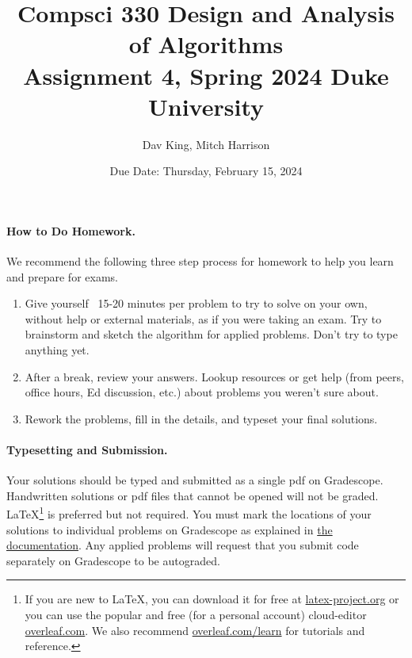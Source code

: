 \documentclass[11pt]{article}
\title{\vspace{-0.5in}Compsci 330 Design and Analysis of Algorithms \\Assignment 4, Spring 2024 Duke University}
\author{Dav King, Mitch Harrison}
\date{Due Date: Thursday, February 15, 2024}
\begin{document}
\maketitle



\paragraph{How to Do Homework.} We recommend the following three step process for homework to help you learn and prepare for exams.
\begin{enumerate}
	\item Give yourself ~15-20 minutes per problem to try to solve on your own, without help or external materials, as if you were taking an exam. Try to brainstorm and sketch the algorithm for applied problems. Don't try to type anything yet.
	\item After a break, review your answers. Lookup resources or get help (from peers, office hours, Ed discussion, etc.) about problems you weren't sure about.
	\item Rework the problems, fill in the details, and typeset your final solutions.
\end{enumerate}

\paragraph{Typesetting and Submission.} Your solutions should be typed and submitted as a single pdf on Gradescope. Handwritten solutions or pdf files that cannot be opened will not be graded. \LaTeX \footnote{If you are new to \LaTeX, you can download it for free at \href{https://www.latex-project.org}{latex-project.org} or you can use the popular and free (for a personal account) cloud-editor \href{https://www.overleaf.com}{overleaf.com}. We also recommend \href{https://www.overleaf.com/learn}{overleaf.com/learn} for tutorials and reference.} is preferred but not required. %
You must mark the locations of your solutions to individual problems on Gradescope as explained in \href{https://help.gradescope.com/article/ccbpppziu9-student-submit-work#submitting_a_pdf}{the documentation}. Any applied problems will request that you submit code separately on Gradescope to be autograded. 
\end{document}

